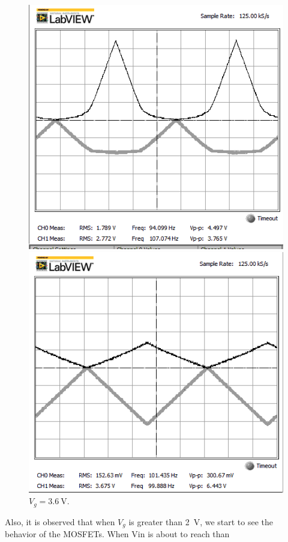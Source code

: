 \documentclass[journal]{IEEEtran}
\begin{document}
\begin{figure}[h]
\centering
\begin{minipage}{.25\textwidth}
  \centering
  \includegraphics[width=.8\linewidth]{images/1-31.png}
  \caption{$V_{g}=\SI{3.1}{\volt}$.}
\end{minipage}%
\begin{minipage}{.25\textwidth}
  \centering
  \includegraphics[width=.8\linewidth]{images/1-36.png}
  \caption{$V_{g}=\SI{3.6}{\volt}$.}
\end{minipage}
\end{figure}
\par Also, it is observed that when $V_{g}$ is greater than \SI{2}{\volt},
we start to see the behavior of the MOSFETs. When Vin is about to reach than
\end{document}
